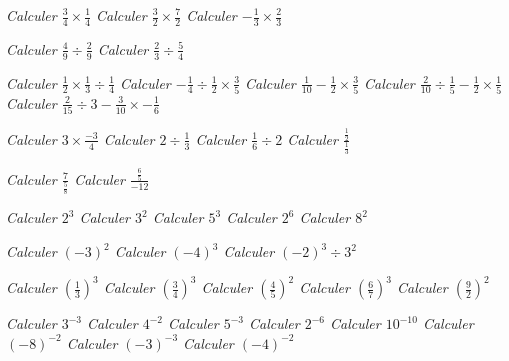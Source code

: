 \fi   \if{}  \it
  Calculer  $\displaystyle\frac34 \times \frac14$
\fi   \if{} \it
  Calculer  $\displaystyle\frac32 \times\frac72$
\fi   \if{} \it
  Calculer  $\displaystyle-\frac13 \times \frac23 $

\fi   \if{}  \it
  Calculer  $\displaystyle\frac49 \div \frac29 $
\fi   \if{}  \it
  Calculer  $\displaystyle\frac23 \div \frac54$

\fi   \if{}  \it
  Calculer  $\displaystyle\frac12 \times \frac13\div \frac14$
\fi   \if{}  \it
  Calculer  $\displaystyle-\frac14 \div  \frac12 \times \frac35$
\fi   \if{}  \it
  Calculer  $\displaystyle\frac1{10} - \frac12\times \frac35$
\fi   \if{}  \it
  Calculer  $\displaystyle\frac2{10}\div\frac15 - \frac12 \times \frac15$
\fi   \if{}  \it
  Calculer  $\displaystyle\frac2{15}\div 3 - \frac3{10} \times - \frac16$

\fi   \if{}  \it
  Calculer  $\displaystyle3\times \frac{-3}4$
\fi   \if{}  \it
  Calculer  $\displaystyle2\div \frac13$
\fi   \if{}  \it
  Calculer  $\displaystyle\frac16\div2$
\fi   \if{}  \it
  Calculer  $\displaystyle\frac{\frac12}{\frac13}$

\fi   \if{}  \it
  Calculer  $\displaystyle\frac{7}{\frac58}$
\fi   \if{}  \it
  Calculer  $\displaystyle\frac{\frac65}{-12}$

\fi   \if{} \it
  Calculer  $2^3$
\fi   \if{}  \it
  Calculer  $3^2$
\fi   \if{}  \it
  Calculer  $5^3$
\fi   \if{}  \it
  Calculer  $2^6$ 
\fi   \if{}  \it
  Calculer  $8^2$

\fi   \if{} \it
  Calculer  $(-3)^2$
\fi   \if{}  \it
  Calculer  $(-4)^3$
\fi   \if{}  \it
  Calculer  $(-2)^3\div3^2$

 \fi   \if{} \it
  Calculer  $\left(\frac13\right)^3$
\fi   \if{}  \it
  Calculer  $\left(\frac34\right)^3$
\fi   \if{}  \it
  Calculer  $\left(\frac45\right)^2$
 \fi   \if{} \it
  Calculer  $\left(\frac67\right)^3$
 \fi   \if{} \it
  Calculer  $\left(\frac92\right)^2$
 
 \fi   \if{} \it
  Calculer  $3^{-3}$
\fi   \if{}  \it
  Calculer  $4^{-2}$
\fi   \if{}  \it
  Calculer  $5^{-3}$
\fi   \if{}  \it
  Calculer  $2^{-6}$ 
\fi   \if{}  \it
  Calculer  $10^{-10}$
\fi   \if{}  \it
  Calculer  $(-8)^{-2}$ 
\fi   \if{}  \it
  Calculer  $(-3)^{-3}$
\fi   \if{}  \it
  Calculer  $(-4)^{-2}$

